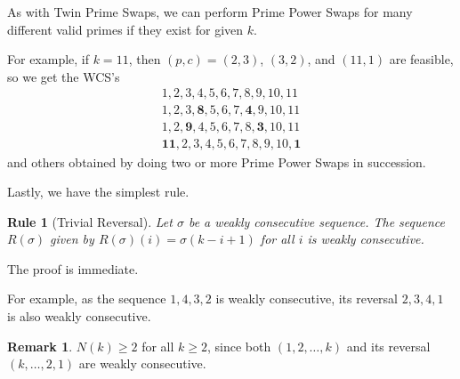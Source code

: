 \documentclass{article}
\newtheorem{rul}{Rule}
\theoremstyle{definition}
\newtheorem*{remark}{Remark}
\theoremstyle{remark}
\numberwithin{equation}{section}
\numberwithin{case}{theorem}
\begin{document}
As with Twin Prime Swaps, we can perform Prime Power Swaps for many different valid primes if they exist for given $k$.

For example, if $k = 11$, then $(p,c) = (2,3)$, $(3,2)$, and $(11,1)$ are feasible, so we get the WCS's
\begin{gather*}
    1,2,3,4,5,6,7,8,9,10,11 \\
    1,2,3,\mathbf{8},5,6,7,\mathbf{4},9,10,11 \\
    1,2,\mathbf{9},4,5,6,7,8,\mathbf{3},10,11 \\
    \mathbf{11},2,3,4,5,6,7,8,9,10,\mathbf{1}
\end{gather*}
and others obtained by doing two or more Prime Power Swaps in succession.


Lastly, we have the simplest rule.

\begin{rul}[Trivial Reversal]\label{rul:triv rev}
    Let $\sigma$ be a weakly consecutive sequence. The sequence $R(\sigma)$ given by $R(\sigma)(i) = \sigma(k-i+1)$ for all $i$ is weakly consecutive.
\end{rul}

The proof is immediate.

For example, as the sequence $1,4,3,2$ is weakly consecutive, its reversal $2,3,4,1$ is also weakly consecutive.

\begin{remark} 
    $N(k) \geq 2$ for all $k \geq 2$, since both $(1,2,\dots,k)$ and its reversal $(k,\dots,2,1)$ are weakly consecutive. %
\end{remark}
\end{document}
